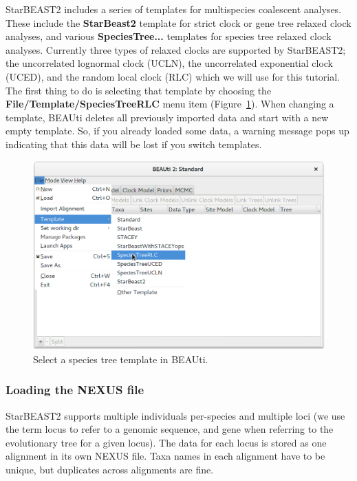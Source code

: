\documentclass{article}
\begin{document}
StarBEAST2 includes a series of templates for multispecies coalescent analyses.
These include the \textbf{StarBeast2} template for strict clock or gene tree
relaxed clock analyses, and various \textbf{SpeciesTree...} templates for species tree
relaxed clock analyses. Currently three types of relaxed clocks are supported by
StarBEAST2; the uncorrelated lognormal clock (UCLN), the uncorrelated
exponential clock (UCED), and the random local clock (RLC) which we will use for
this tutorial.  The first thing to do is selecting that template by choosing the
\textbf{File/Template/SpeciesTreeRLC} menu item (Figure~\ref{fig:sb2Template}).
When changing a template, BEAUti deletes all previously imported data and start
with a new empty template. So, if you already loaded some data, a warning
message pops up indicating that this data will be lost if you switch templates.

\begin{figure}[htb!]
\centering
\includegraphics[width=\textwidth]{figures/beauti-rlc.png}
\caption{Select a species tree template in BEAUti.}
\label{fig:sb2Template}
\end{figure}

\clearpage

\subsubsection*{Loading the NEXUS file}

StarBEAST2 supports multiple individuals per-species and multiple loci (we use
the term locus to refer to a genomic sequence, and gene when referring to the
evolutionary tree for a given locus). The data for each locus is stored as one
alignment in its own NEXUS file. Taxa names in each alignment have to be unique,
but duplicates across alignments are fine.
\end{document}
